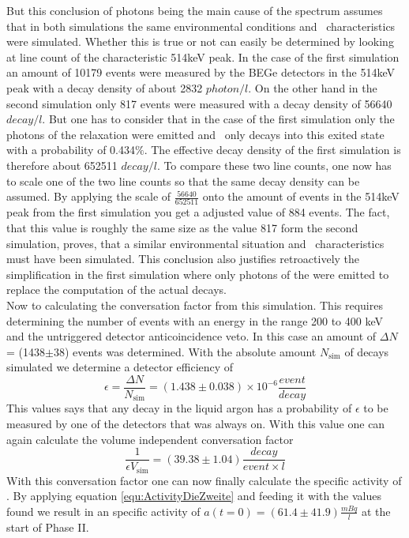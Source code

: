 \documentclass[encoding=utf8,british]{tumphthesis}
\begin{document}
But this conclusion of photons being the main cause of the spectrum assumes that in both simulations the same environmental conditions and \Kr\ characteristics were simulated.
Whether this is true or not can easily be determined by looking at line count of the characteristic 514keV peak.
In the case of the first simulation an amount of 10179 events were measured by the BEGe detectors in the 514keV peak with a decay density of about 2832 $\unit{photon}/\unit{l}$.
On the other hand in the second simulation only 817 events were measured with a decay density of 56640$\unit{decay}/\unit{l}$.
But one has to consider that in the case of the first simulation only the photons of the  relaxation were emitted and \Kr\ only decays into this exited state with a probability of 0.434$\%$.
The effective decay density of the first simulation is therefore about 652511 $\unit{decay}/\unit{l}$.
To compare these two line counts, one now has to scale one of the two line counts so that the same decay density can be assumed.
By applying the scale of $\frac{56640}{652511}$ onto the amount of events in the 514keV peak from the first simulation you get a adjusted value of 884 events.
The fact, that this value is roughly the same size as the value 817 form the second simulation, proves, that a similar environmental situation and \Kr\ characteristics must have been simulated.
This conclusion also justifies retroactively the simplification in the first simulation where only photons of the  were emitted to replace the computation of the actual decays.
\\

Now to calculating the conversation factor from this simulation.
This requires determining the number of events with an energy in the range 200 to 400 keV and the untriggered detector anticoincidence veto.
In this case an amount of $\Delta N$ = (1438$\pm$38) events was determined.
With the absolute amount $N_{\mathrm{sim}}$ of decays simulated we determine a detector efficiency of
\begin{equation*}
\epsilon = \frac{\Delta N}{N_{\mathrm{sim}}} = (1.438\pm0.038)\times10^{-6} \frac{\unit{event}}{\unit{decay}}
\end{equation*}
This values says that any decay in the liquid argon has a probability of $\epsilon$ to be measured by one of the detectors that was always on.
With this value one can again calculate the volume independent conversation factor
\begin{equation*}
\frac{1}{\epsilon V_{\mathrm{sim}}} = (39.38\pm1.04) \frac{\unit{decay}}{\unit{event} \times \unit{l} }
\end{equation*}
With this conversation factor one can now finally calculate the specific activity of \Kr.
By applying equation \ref{equ:ActivityDieZweite} and feeding it with the values found we result in an specific activity of $a(t=0) = (61.4\pm41.9) \frac{\unit{mBq}}{\unit{l}}$ at the start of Phase II.
\end{document}
